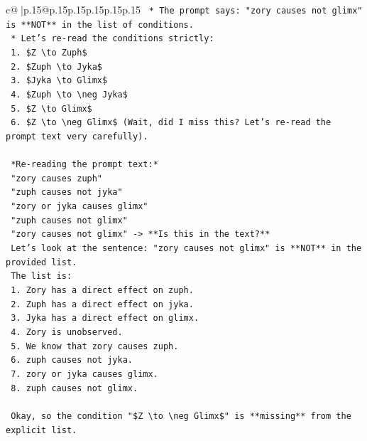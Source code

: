 \documentclass{article}
\begin{document}
{\begin{supertabular}{c@{$\;$}|p{.15\linewidth}@{}p{.15\linewidth}p{.15\linewidth}p{.15\linewidth}p{.15\linewidth}p{.15\linewidth}}
{{{\texttt{    *   The prompt says: "zory causes not glimx" is **NOT** in the list of conditions.} \\
\texttt{    *   Let's re{-}read the conditions strictly:} \\
\texttt{        1.  \$Z \textbackslash{}to Zuph\$} \\
\texttt{        2.  \$Zuph \textbackslash{}to Jyka\$} \\
\texttt{        3.  \$Jyka \textbackslash{}to Glimx\$} \\
\texttt{        4.  \$Zuph \textbackslash{}to \textbackslash{}neg Jyka\$} \\
\texttt{        5.  \$Z \textbackslash{}to Glimx\$} \\
\texttt{        6.  \$Z \textbackslash{}to \textbackslash{}neg Glimx\$ (Wait, did I miss this? Let's re{-}read the prompt text very carefully).} \\
\\ 
\texttt{    *Re{-}reading the prompt text:*} \\
\texttt{    "zory causes zuph"} \\
\texttt{    "zuph causes not jyka"} \\
\texttt{    "zory or jyka causes glimx"} \\
\texttt{    "zuph causes not glimx"} \\
\texttt{    "zory causes not glimx" {-}> **Is this in the text?**} \\
\texttt{    Let's look at the sentence: "zory causes not glimx" is **NOT** in the provided list.} \\
\texttt{    The list is:} \\
\texttt{    1. Zory has a direct effect on zuph.} \\
\texttt{    2. Zuph has a direct effect on jyka.} \\
\texttt{    3. Jyka has a direct effect on glimx.} \\
\texttt{    4. Zory is unobserved.} \\
\texttt{    5. We know that zory causes zuph.} \\
\texttt{    6. zuph causes not jyka.} \\
\texttt{    7. zory or jyka causes glimx.} \\
\texttt{    8. zuph causes not glimx.} \\
\\ 
\texttt{    Okay, so the condition "\$Z \textbackslash{}to \textbackslash{}neg Glimx\$" is **missing** from the explicit list.} \\
}}}
\end{supertabular}}
\end{document}
